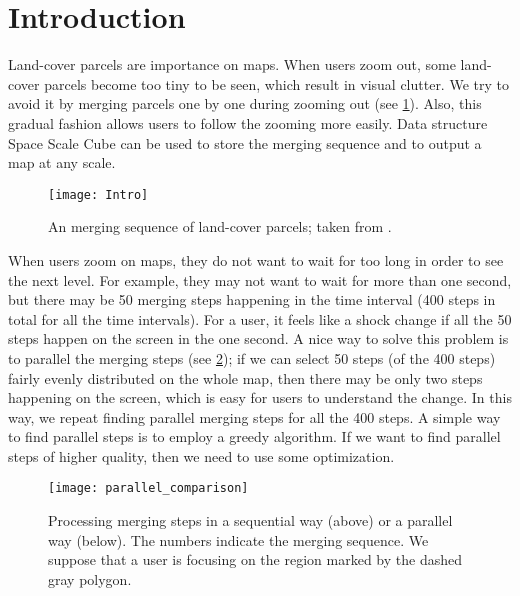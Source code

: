 \documentclass[ijgi,article,submit,moreauthors,pdftex]{Definitions/mdpi}
\begin{document}



\section{Introduction}

Land-cover parcels are importance on maps. 
When users zoom out,
some land-cover parcels become too tiny to be seen,
which result in visual clutter.
We try to avoid it
by merging parcels one by one during zooming out
(see \fig\ref{fig:aggregation_sequence}).
Also, this gradual fashion allows users 
to follow the zooming more easily.
Data structure Space Scale Cube \citep{vanOosterom2014tGAPSSC} 
can be used to store the merging sequence and 
to output a map at any scale.

\begin{figure}[htb]
\centering
\texttt{[image: Intro]}
\caption{An merging sequence of land-cover parcels; 
taken from \citet[][]{Peng2019Thesis}.}
\label{fig:aggregation_sequence}
\end{figure}

When users zoom on maps, 
they do not want to wait for too long 
in order to see the next level.
For example, they may not want to wait for more than one second,
but there may be 50 merging steps happening in the time interval
(400 steps in total for all the time intervals).
For a user, it feels like a shock change 
if all the 50 steps happen on the screen in the one second.
A nice way to solve this problem is to parallel the merging steps
(see \fig\ref{fig:parallel_comparison});
if we can select 50 steps (of the 400 steps) 
fairly evenly distributed on the whole map, 
then there may be only two steps happening on the screen,
which is easy for users to understand the change.
In this way, we repeat finding parallel merging steps 
for all the 400 steps.
A simple way to find parallel steps is to employ a greedy algorithm.
If we want to find parallel steps of higher quality, 
then we need to use some optimization.

\begin{figure}[htb]
\centering
\texttt{[image: parallel\_comparison]}
\caption{Processing merging steps in a sequential way (above) or a parallel way (below). 
The numbers indicate the merging sequence.
We suppose that a user is focusing on the region marked by the dashed gray polygon.}
\label{fig:parallel_comparison}
\end{figure}
\end{document}
